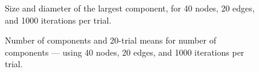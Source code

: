 \documentclass[a4paper,10pt]{article}
\begin{document}
\begin{figure}[H]
\begin{center}
\caption{Size and diameter of the largest component, for 40 nodes, 20 edges, and 1000 iterations per trial.}
\end{center}
\end{figure} 

\begin{figure}[H]
\begin{center}
\caption{Number of components and 20-trial means for number of components --- using 40 nodes, 20 edges, and 1000 iterations per trial.}
\end{center}
\end{figure} 
\end{document}
